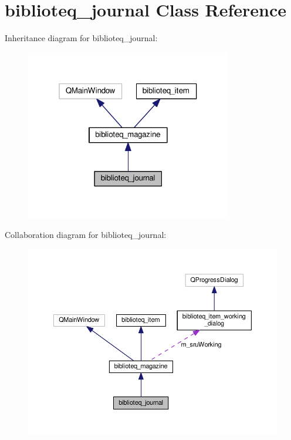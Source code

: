 \hypertarget{classbiblioteq__journal}{}\section{biblioteq\+\_\+journal Class Reference}
\label{classbiblioteq__journal}


Inheritance diagram for biblioteq\+\_\+journal\+:
\nopagebreak
\begin{figure}[H]
\begin{center}
\leavevmode
\includegraphics[width=256pt]{classbiblioteq__journal__inherit__graph}
\end{center}
\end{figure}


Collaboration diagram for biblioteq\+\_\+journal\+:
\nopagebreak
\begin{figure}[H]
\begin{center}
\leavevmode
\includegraphics[width=350pt]{classbiblioteq__journal__coll__graph}
\end{center}
\end{figure}
